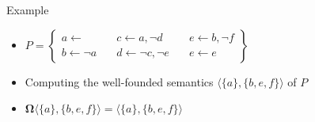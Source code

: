 \begin{frame}{Example}
  \bigskip
  \begin{itemize}
  \item
    \(
    P
    =
    \left\{
      \begin{array}{lll}
        a \leftarrow                \quad &
        c \leftarrow a, \neg d      \quad &
        e \leftarrow b, \neg f
        \\
        b \leftarrow \neg a         \quad &
        d \leftarrow \neg c, \neg e \quad &
        e \leftarrow e
      \end{array}
    \right\}
    \)
  \bigskip
\item Computing the well-founded semantics
  \(
  \langle\{a\},\{b,e,f\}\rangle
  \)
  of $P$
  \medskip
\item {} \quad
  \(
  \mathbf{\Omega}\langle\{a\},\{b,e,f\}\rangle=\langle\{a\},\{b,e,f\}\rangle
  \)
  \end{itemize}
\end{frame}
%
